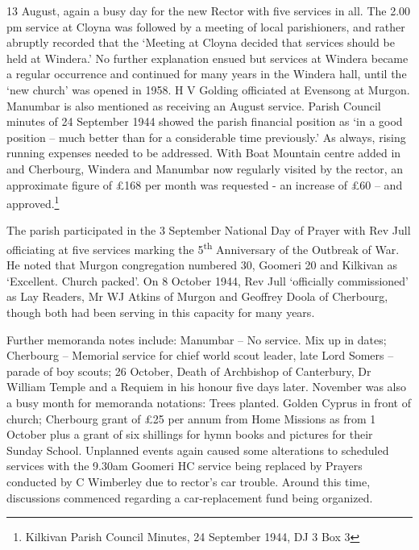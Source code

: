13 August, again a busy day for the new Rector with five services in all. The 2.00 pm service at Cloyna was followed by a meeting of local parishioners, and rather abruptly recorded that the `Meeting at Cloyna decided that services should be held at Windera.' No further explanation ensued but services at Windera became a regular occurrence and continued for many years in the Windera hall, until the `new church' was opened in 1958. H V Golding officiated at Evensong at Murgon. Manumbar is also mentioned as receiving an August service. Parish Council minutes of 24 September 1944 showed the parish financial position as `in a good position -- much better than for a considerable time previously.' As always, rising running expenses needed to be addressed. With Boat Mountain centre added in and Cherbourg, Windera and Manumbar now regularly visited by the rector, an approximate figure of £168 per month was requested - an increase of £60 -- and approved.\footnote{Kilkivan Parish Council Minutes, 24 September 1944, DJ 3 Box 3}

The parish participated in the 3 September National Day of Prayer with Rev Jull officiating at five services marking the 5\textsuperscript{th} Anniversary of the Outbreak of War. He noted that Murgon congregation numbered 30, Goomeri 20 and Kilkivan as `Excellent. Church packed'. On 8 October 1944, Rev Jull `officially commissioned' as Lay Readers, Mr WJ Atkins of Murgon and Geoffrey Doola of Cherbourg, though both had been serving in this capacity for many years.

Further memoranda notes include: Manumbar -- No service. Mix up in dates; Cherbourg -- Memorial service for chief world scout leader, late Lord Somers -- parade of boy scouts; 26 October, Death of Archbishop of Canterbury, Dr William Temple and a Requiem in his honour five days later. November was also a busy month for memoranda notations: Trees planted. Golden Cyprus in front of church; Cherbourg grant of £25 per annum from Home Missions as from 1 October plus a grant of six shillings for hymn books and pictures for their Sunday School. Unplanned events again caused some alterations to scheduled services with the 9.30am Goomeri HC service being replaced by Prayers conducted by C Wimberley due to rector's car trouble. Around this time, discussions commenced regarding a car-replacement fund being organized.

